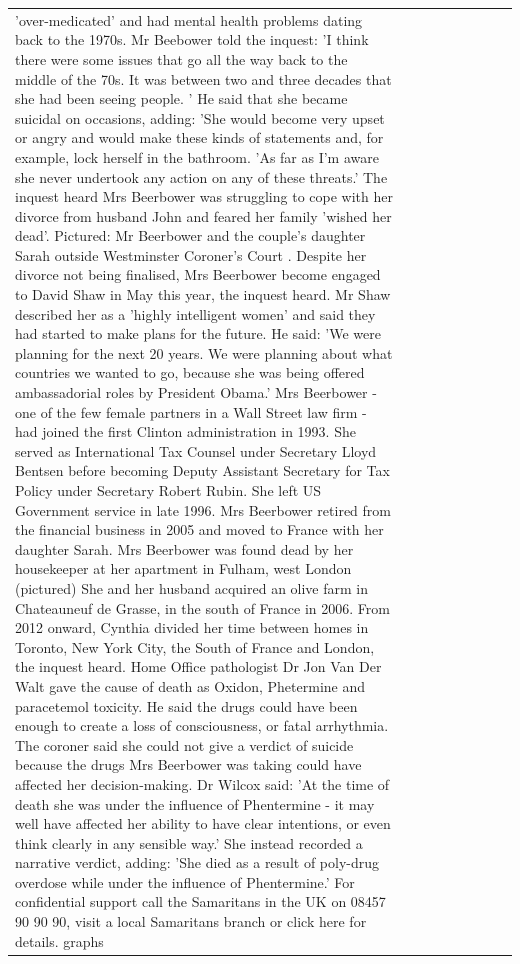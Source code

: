\begin{table}[H]
\begin{tabular}{lllrlllll}
'over-medicated' and had mental health problems dating back to the 1970s. Mr Beebower told the inquest: 'I think there were some issues that go all the way back to the middle of the 70s. It was between two and three decades that she had been seeing people. ' He said that she became suicidal on occasions, adding: 'She would become very upset or angry and would make these kinds of statements and, for example, lock herself in the bathroom. 'As far as I'm aware she never undertook any action on any of these threats.' The inquest heard Mrs Beerbower was struggling to cope with her divorce from husband John and feared her family 'wished her dead'. Pictured: Mr Beerbower and the couple's daughter Sarah outside Westminster Coroner's Court . Despite her divorce not being finalised, Mrs Beerbower become engaged to David Shaw in May this year, the inquest heard. Mr Shaw described her as a 'highly intelligent women' and said they had started to make plans for the future. He said: 'We were planning for the next 20 years. We were planning about what countries we wanted to go, because she was being offered ambassadorial roles by President Obama.' Mrs Beerbower - one of the few female partners in a Wall Street law firm - had joined the first Clinton administration in 1993. She served as International Tax Counsel under Secretary Lloyd Bentsen before becoming Deputy Assistant Secretary for Tax Policy under Secretary Robert Rubin. She left US Government service in late 1996. Mrs Beerbower retired from the financial business in 2005 and moved to France with her daughter Sarah. Mrs Beerbower was found dead by her housekeeper at her apartment in Fulham, west London (pictured) She and her husband acquired an olive farm in Chateauneuf de Grasse, in the south of France in 2006. From 2012 onward, Cynthia divided her time between homes in Toronto, New York City, the South of France and London, the inquest heard. Home Office pathologist Dr Jon Van Der Walt gave the cause of death as Oxidon, Phetermine and paracetemol toxicity. He said the drugs could have been enough to create a loss of consciousness, or fatal arrhythmia. The coroner said she could not give a verdict of suicide because the drugs Mrs Beerbower was taking could have affected her decision-making. Dr Wilcox said: 'At the time of death she was under the influence of Phentermine - it may well have affected her ability to have clear intentions, or even think clearly in any sensible way.' She instead recorded a narrative verdict, adding: 'She died as a result of poly-drug overdose while under the influence of Phentermine.' For confidential support call the Samaritans in the UK on 08457 90 90 90, visit a local Samaritans branch or click here for details. graphs \\

\end{tabular}
\end{table}
